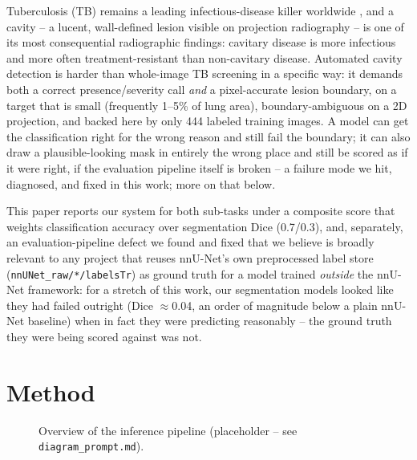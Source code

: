 \documentclass[runningheads]{llncs}
\begin{document}
Tuberculosis (TB) remains a leading infectious-disease killer worldwide
\cite{who2023}, and a cavity -- a lucent, wall-defined lesion visible on
projection radiography -- is one of its most consequential radiographic
findings: cavitary disease is more infectious and more often
treatment-resistant than non-cavitary disease. Automated cavity detection
is harder than whole-image TB screening in a specific way: it demands both
a correct presence/severity call \emph{and} a pixel-accurate lesion
boundary, on a target that is small (frequently 1--5\% of lung area),
boundary-ambiguous on a 2D projection, and backed here by only 444 labeled
training images. A model can get the classification right for the wrong
reason and still fail the boundary; it can also draw a plausible-looking
mask in entirely the wrong place and still be scored as if it were right,
if the evaluation pipeline itself is broken -- a failure mode we hit,
diagnosed, and fixed in this work; more on that below.

This paper reports our system for both sub-tasks under a composite score
that weights classification accuracy over segmentation Dice (0.7/0.3), and,
separately, an evaluation-pipeline defect we found and fixed that we
believe is broadly relevant to any project that reuses nnU-Net's own
preprocessed label store (\texttt{nnUNet\_raw/*/labelsTr}) as ground truth
for a model trained \emph{outside} the nnU-Net framework: for a stretch of
this work, our segmentation models looked like they had failed outright
(Dice $\approx$0.04, an order of magnitude below a plain nnU-Net baseline)
when in fact they were predicting reasonably -- the ground truth they were
being scored against was not.

\section{Method}

\begin{figure}[t]
\centering
{}
\caption{Overview of the inference pipeline (placeholder -- see
\texttt{diagram\_prompt.md}).}
\label{fig:arch}
\end{figure}
\end{document}
